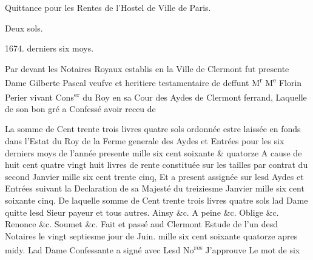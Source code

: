 \documentclass[11pt,a4paper]{article}
\begin{document}

Quittance pour les Rentes de l'Hostel de Ville de Paris.

Deux sols.

1674. derniers six moys.

Par devant les Notaires Royaux establis en la Ville de Clermont fut presente Dame Gilberte Pascal veufve et heritiere testamentaire de deffunt M\textsuperscript{r} M\textsuperscript{e} Florin Perier vivant Cons\textsuperscript{er} du Roy en sa Cour des Aydes de Clermont ferrand, Laquelle de son bon gré a Confessé avoir receu de

La somme de Cent trente trois livres quatre sols ordonnée estre laissée en fonds dans l'Estat du Roy de la Ferme generale des Aydes et Entrées pour les six derniers moys de l'année presente mille six cent soixante \& quatorze A cause de huit cent quatre vingt huit livres de rente constituée sur les tailles par contrat du second Janvier mille six cent trente cinq, Et a present assignée sur lesd Aydes et Entrées suivant la Declaration de sa Majesté du treiziesme Janvier mille six cent soixante cinq. De laquelle somme de Cent trente trois livres quatre sols lad Dame quitte lesd Sieur payeur et tous autres. Ainsy \&c. A peine \&c. Oblige \&c. Renonce \&c. Soumet \&c. Fait et passé aud Clermont Estude de l'un desd Notaires le vingt septiesme jour de Juin. mille six cent soixante quatorze apres midy. Lad Dame Confessante a signé avec Lesd No\textsuperscript{res} J'approuve Le mot de six \ill{}
\end{document}
